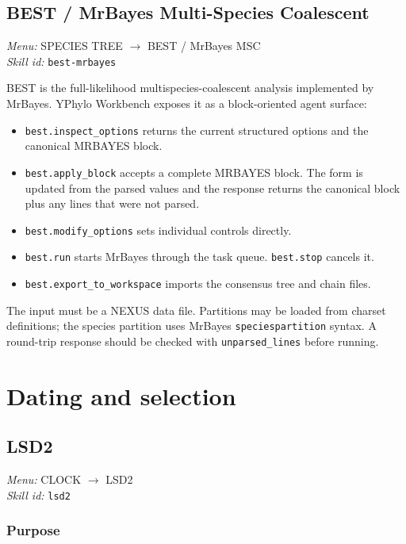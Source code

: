 \documentclass[11pt]{report}
\begin{document}
\section{BEST / MrBayes Multi-Species Coalescent}
\noindent\textit{Menu:} SPECIES TREE $\rightarrow$ BEST / MrBayes MSC\\
\noindent\textit{Skill id:} \texttt{best-mrbayes}

BEST is the full-likelihood multispecies-coalescent analysis implemented by MrBayes. YPhylo Workbench exposes it as a block-oriented agent surface:

\begin{itemize}
  \item \texttt{best.\allowbreak inspect\_\allowbreak options} returns the current structured options and the canonical MRBAYES block.
  \item \texttt{best.\allowbreak apply\_\allowbreak block} accepts a complete MRBAYES block. The form is updated from the parsed values and the response returns the canonical block plus any lines that were not parsed.
  \item \texttt{best.\allowbreak modify\_\allowbreak options} sets individual controls directly.
  \item \texttt{best.\allowbreak run} starts MrBayes through the task queue. \texttt{best.\allowbreak stop} cancels it.
  \item \texttt{best.\allowbreak export\_\allowbreak to\_\allowbreak workspace} imports the consensus tree and chain files.
\end{itemize}

The input must be a NEXUS data file. Partitions may be loaded from charset definitions; the species partition uses MrBayes \texttt{speciespartition} syntax. A round-trip response should be checked with \texttt{unparsed\_\allowbreak lines} before running.


\chapter{Dating and selection}
\section{LSD2}
\noindent\textit{Menu:} CLOCK $\rightarrow$ LSD2\\
\noindent\textit{Skill id:} \texttt{lsd2}

\subsection{Purpose}
\end{document}
